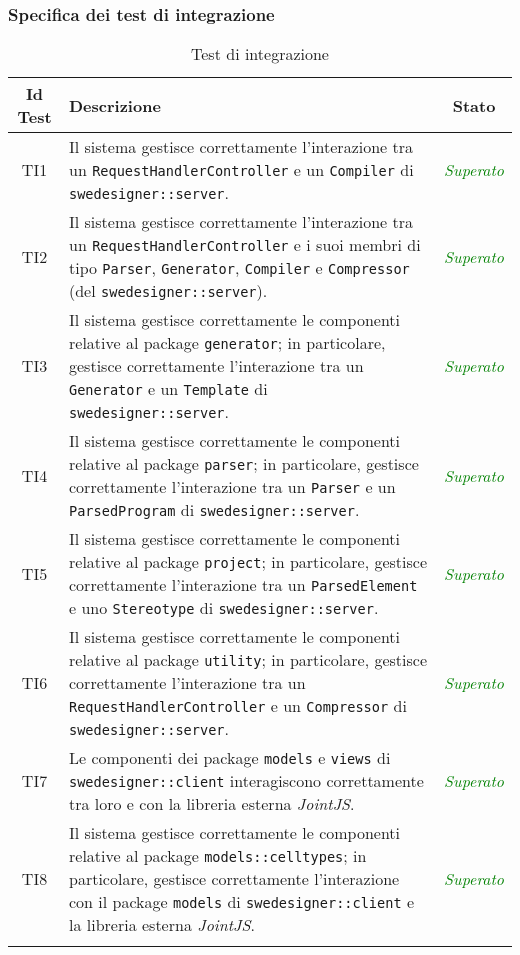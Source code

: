 \subsubsection{Specifica dei test di integrazione}
\normalsize
\begin{longtable}{|c|>{}m{8cm}|c|}
\hline
\textbf{Id Test} & \textbf{Descrizione} & \textbf{Stato}\\
\hline
\endhead
\hypertarget{TI1}{TI1} & Il sistema gestisce correttamente l'interazione tra un \texttt{RequestHandlerController} e un \texttt{Compiler} di \texttt{swedesigner::server}. & \textcolor{Green}{\textit{Superato}}\\ \hline
\hypertarget{TI2}{TI2} & Il sistema gestisce correttamente l'interazione tra un \texttt{RequestHandlerController} e i suoi membri di tipo \texttt{Parser}, \texttt{Generator}, \texttt{Compiler} e \texttt{Compressor} (del \texttt{swedesigner::server}). & \textcolor{Green}{\textit{Superato}}\\ \hline
\hypertarget{TI3}{TI3} & Il sistema gestisce correttamente le componenti relative al package \texttt{generator}; in particolare, gestisce correttamente l'interazione tra un \texttt{Generator} e un \texttt{Template} di \texttt{swedesigner::server}. & \textcolor{Green}{\textit{Superato}}\\ \hline
\hypertarget{TI4}{TI4} & Il sistema gestisce correttamente le componenti relative al package \texttt{parser}; in particolare, gestisce correttamente l'interazione tra un \texttt{Parser} e un \texttt{ParsedProgram} di \texttt{swedesigner::server}. & \textcolor{Green}{\textit{Superato}}\\ \hline
\hypertarget{TI5}{TI5} & Il sistema gestisce correttamente le componenti relative al package \texttt{project}; in particolare, gestisce correttamente l'interazione tra un \texttt{ParsedElement} e uno \texttt{Stereotype} di \texttt{swedesigner::server}. & \textcolor{Green}{\textit{Superato}}\\ \hline
\hypertarget{TI6}{TI6} & Il sistema gestisce correttamente le componenti relative al package \texttt{utility}; in particolare, gestisce correttamente l'interazione tra un \texttt{RequestHandlerController} e un \texttt{Compressor} di \texttt{swedesigner::server}. & \textcolor{Green}{\textit{Superato}}\\ \hline
\hypertarget{TI7}{TI7} & Le componenti dei package \texttt{models} e \texttt{views} di \texttt{swedesigner::client} interagiscono correttamente tra loro e con la libreria esterna \emph{JointJS}. & \textcolor{Green}{\textit{Superato}}\\ \hline
\hypertarget{TI8}{TI8} & Il sistema gestisce correttamente le componenti relative al package \texttt{models::celltypes}; in particolare, gestisce correttamente l'interazione con il package \texttt{models} di \texttt{swedesigner::client} e la libreria esterna \emph{JointJS}. & \textcolor{Green}{\textit{Superato}}\\ \hline
\caption[Test di integrazione]{Test di integrazione}
\label{tab:integr}
\end{longtable}
\clearpage

